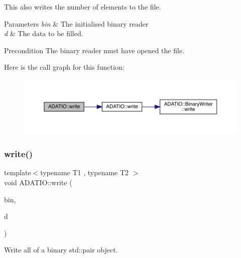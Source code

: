 This also writes the number of elements to the file. 
\begin{DoxyParams}{Parameters}
{\em bin} & The initialised binary reader \\
\hline
{\em d} & The data to be filled.\\
\hline
\end{DoxyParams}
\begin{DoxyPrecond}{Precondition}
The binary reader must have opened the file. 
\end{DoxyPrecond}
Here is the call graph for this function\+:\nopagebreak
\begin{figure}[H]
\begin{center}
\leavevmode
\includegraphics[width=350pt]{d0/dba/namespaceADATIO_acc2655a91a7a0608906b55f7533bde55_cgraph}
\end{center}
\end{figure}
\mbox{\label{namespaceADATIO_a29572ec079e7257de618b505e0baee59}} 
\subsubsection{\texorpdfstring{write()}{write()}\hspace{0.1cm}{\footnotesize\ttfamily [25/25]}}
{\footnotesize\ttfamily template$<$typename T1 , typename T2 $>$ \\
void A\+D\+A\+T\+I\+O\+::write (\begin{DoxyParamCaption}\item[{\mbox{\hyperlink{classADATIO_1_1BinaryWriter}{Binary\+Writer}} \&}]{bin,  }\item[{const std\+::pair$<$ T1, T2 $>$ \&}]{d }\end{DoxyParamCaption})\hspace{0.3cm}{\ttfamily [inline]}}



Write all of a binary std\+::pair object. 

